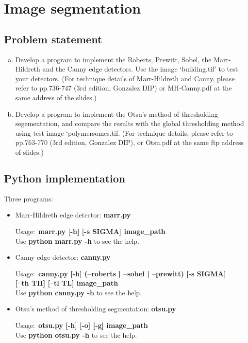 \chapter{Image segmentation}

\section{Problem statement}

\begin{enumerate}[(a)]
    \item Develop a program to implement the Roberts, Prewitt,
Sobel, the Marr-Hildreth and the Canny edge detectors. Use the
image ‘building.tif’ to test your detectors. (For technique details
of Marr-Hildreth and Canny, please refer to pp.736-747 (3rd
edition, Gonzalez DIP) or MH-Canny.pdf at the same address of
the slides.)

    \item Develop a program to implement the Otsu’s method of
thresholding segementation, and compare the results with the
global thresholding method using test image ‘polymersomes.tif.
(For technique details, please refer to pp.763-770 (3rd edition,
Gonzalez DIP), or Otsu.pdf at the same ftp address of slides.)

\end{enumerate}


\section{Python implementation}
\bigskip
Three programs: \\
\begin{itemize}
    \item Marr-Hildreth edge detector: \textbf{marr.py}

    Usage:~\textbf{marr.py [-h] [-s SIGMA] image\_path} \\
    Use \textbf{python marr.py -h} to see the help.

    \bigskip

    \item Canny edge detector: \textbf{canny.py}

    Usage:~\textbf{canny.py [-h] (--roberts | --sobel | --prewitt) [-s SIGMA]} \\
           \textbf{[--th TH] [--tl TL] image\_path} \\
    Use \textbf{python canny.py -h} to see the help.

    \bigskip

    \item Otsu's method of thresholding segmentation: \textbf{otsu.py}

    Usage:~\textbf{otsu.py [-h] [-o] [-g] image\_path} \\
    Use \textbf{python otsu.py -h} to see the help.

\end{itemize}


